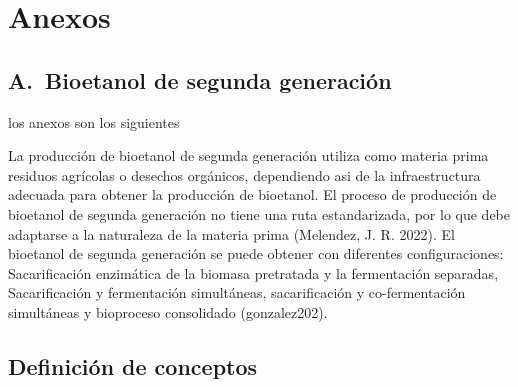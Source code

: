 \documentclass[12pt]{article}
\begin{document}
	   





		
\section*{Anexos}		
		
\setcounter{anexo}{0}

\subsection*{A.\theanexo\ Bioetanol de segunda generación}
	

		los anexos son los siguientes
		\label{marco conceptual}
		
		
		
		La producción de bioetanol de segunda generación utiliza como materia prima residuos agrícolas o desechos orgánicos, dependiendo asi de la infraestructura adecuada para obtener la producción de bioetanol. El proceso de producción de bioetanol de segunda generación no tiene una ruta estandarizada, por lo que debe adaptarse a la naturaleza de la materia prima \cite{melendez2022biotecnologia} (Melendez, J. R. 2022). El bioetanol de segunda generación se puede obtener con diferentes configuraciones: Sacarificación enzimática de la biomasa pretratada y la fermentación separadas, Sacarificación y fermentación simultáneas, sacarificación y co-fermentación simultáneas y bioproceso consolidado (gonzalez202).
		
	
		\subsection{ Definición de conceptos }
		
\end{document}
